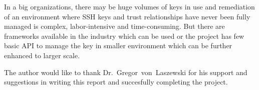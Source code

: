 In a big organizations, there may be huge volumes of keys in use and
remediation of an environment where SSH keys and trust relationships 
have never been fully managed is complex, labor-intensive and 
time-consuming. But there are frameworks available in the industry which 
can be used or the project has few basic API to manage the key in smaller 
environment which can be further enhanced to larger scale.


\begin{acks}
The author would like to thank Dr.~Gregor~von~Laszewski for his support and 
suggestions in writing this report and succesfully completing the project.
\end{acks}










